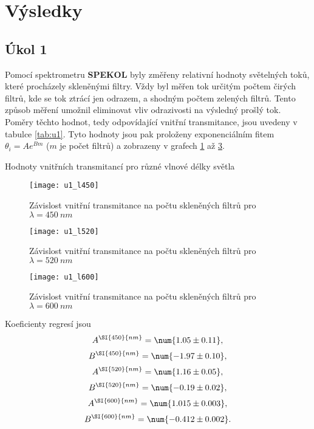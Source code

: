 \documentclass{protokol}
\begin{document}
  \newpage
  \section*{Výsledky}

    \subsection*{Úkol 1}

      Pomocí spektrometru \textbf{SPEKOL} byly změřeny relativní hodnoty světelných toků, které procházely skleněnými filtry. Vždy byl měřen tok určitým počtem čirých filtrů, kde se tok ztrácí jen odrazem, a shodným počtem zelených filtrů. Tento způsob měření umožnil eliminovat vliv odrazivosti na výsledný prošlý tok. Poměry těchto hodnot, tedy odpovídající vnitřní transmitance, jsou uvedeny v tabulce \ref{tab:u1}. Tyto hodnoty jsou pak proloženy exponenciálním fitem $\theta_i = Ae^{Bm}$ ($m$ je počet filtrů) a zobrazeny v grafech \ref{fig:u1_l450} až \ref{fig:u1_l600}. 

      \begin{table}[H]
        \centering
        \setlength{\tabcolsep}{10pt}
        
        \caption{Hodnoty vnitřních transmitancí pro různé vlnové délky světla}
        \label{tab:u1}
      \end{table}

      \begin{figure}[H]
        \centering
        \texttt{[image: u1\_l450]}
        \caption{Závislost vnitřní transmitance na počtu skleněných filtrů pro $\lambda = \SI{450}{nm}$}
        \label{fig:u1_l450}
      \end{figure}

      \begin{figure}[H]
        \centering
        \texttt{[image: u1\_l520]}
        \caption{Závislost vnitřní transmitance na počtu skleněných filtrů pro $\lambda = \SI{520}{nm}$}
        \label{fig:u1_l520}
      \end{figure}

      \begin{figure}[H]
        \centering
        \texttt{[image: u1\_l600]}
        \caption{Závislost vnitřní transmitance na počtu skleněných filtrů pro $\lambda = \SI{600}{nm}$}
        \label{fig:u1_l600}
      \end{figure}

      Koeficienty regresí jsou
      $$ A^{\SI{450}{nm}} = \num{1.05 \pm 0.11}, $$
      $$ B^{\SI{450}{nm}} = \num{-1.97 \pm 0.10}, $$
      $$ A^{\SI{520}{nm}} = \num{1.16 \pm 0.05}, $$
      $$ B^{\SI{520}{nm}} = \num{-0.19 \pm 0.02}, $$
      $$ A^{\SI{600}{nm}} = \num{1.015 \pm 0.003}, $$
      $$ B^{\SI{600}{nm}} = \num{-0.412 \pm 0.002}. $$
\end{document}
